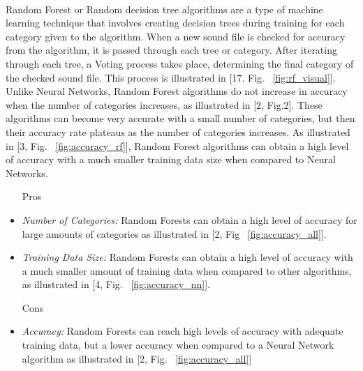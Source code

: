 \documentclass[12pt,journal,compsoc]{IEEEtran}
\newenvironment{subs}
  {\adjustwidth{1em}{0pt}}
  {\endadjustwidth}
\begin{document}
\begin{subs}
\begin{subs}
\begin{subs}
\\
Random Forest or Random decision tree algorithms are a type of machine learning technique that involves creating decision trees during training for each category given to the algorithm. When a new sound file is checked for accuracy from the algorithm, it is passed through each tree or category. After iterating through each tree, a Voting process takes place, determining the final category of the checked sound file. This process is illustrated in [17. Fig. ~\ref{fig:rf_visual}]. Unlike Neural Networks, Random Forest algorithms do not increase in accuracy when the number of categories increases, as illustrated in [2, Fig.2]. These algorithms can become very accurate with a small number of categories, but then their accuracy rate plateaus as the number of categories increases. As illustrated in [3, Fig. ~\ref{fig:accuracy_rf}], Random Forest algorithms can obtain a high level of accuracy with a much smaller training data size when compared to Neural Networks. 

\begin{subs}
\begin{itemize}
    \item [{Pros}]
    \item \emph{Number of Categories:} Random Forests can obtain a high level of accuracy for large amounts of categories as illustrated in [2, Fig ~\ref{fig:accuracy_all}].
    \item \emph{Training Data Size:} Random Forests can obtain a high level of accuracy with a much smaller amount of training data when compared to other algorithms, as illustrated in [4, Fig. ~\ref{fig:accuracy_nn}].
    \item [{Cons}]
    \item \emph{Accuracy:} Random Forests can reach high levels of accuracy with adequate training data, but a lower accuracy when compared to a Neural Network algorithm as illustrated in [2, Fig. ~\ref{fig:accuracy_all}]
\end{itemize}
\end{subs}



\end{subs}
\end{subs}
\end{subs}
\end{document}
